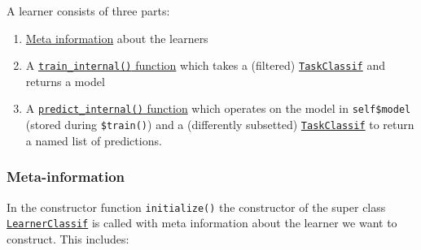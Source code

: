 \documentclass[]{article}
\providecommand{\tightlist}{%
  \setlength{\itemsep}{0pt}\setlength{\parskip}{0pt}}
\begin{document}
A learner consists of three parts:

\begin{enumerate}
\def\labelenumi{\arabic{enumi}.}
\tightlist
\item
  \protect\hyperlink{learner-meta-information}{Meta information} about the learners
\item
  A \protect\hyperlink{learner-train}{\texttt{train\_internal()} function} which takes a (filtered) \href{https://mlr3.mlr-org.com/reference/TaskClassif.html}{\texttt{TaskClassif}} and returns a model
\item
  A \protect\hyperlink{learner-predict}{\texttt{predict\_internal()} function} which operates on the model in \texttt{self\$model} (stored during \texttt{\$train()}) and a (differently subsetted) \href{https://mlr3.mlr-org.com/reference/TaskClassif.html}{\texttt{TaskClassif}} to return a named list of predictions.
\end{enumerate}

\hypertarget{learner-meta-information}{%
\subsubsection{Meta-information}\label{learner-meta-information}}

In the constructor function \texttt{initialize()} the constructor of the super class \href{https://mlr3.mlr-org.com/reference/LearnerClassif.html}{\texttt{LearnerClassif}} is called with meta information about the learner we want to construct.
This includes:
\end{document}
